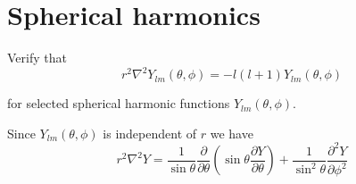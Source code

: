 

\section*{Spherical harmonics}

Verify that
\begin{equation*}
r^2\nabla^2Y_{lm}(\theta,\phi)=-l(l+1)Y_{lm}(\theta,\phi)
\end{equation*}

for selected spherical harmonic functions $Y_{lm}(\theta,\phi)$.

\bigskip
Since $Y_{lm}(\theta,\phi)$ is independent of $r$ we have
\begin{equation*}
r^2\nabla^2Y=\frac{1}{\sin\theta}\frac{\partial}{\partial\theta}
\left(\sin\theta\frac{\partial Y}{\partial\theta}\right)
+\frac{1}{\sin^2\theta}\frac{\partial^2Y}{\partial\phi^2}
\end{equation*}


